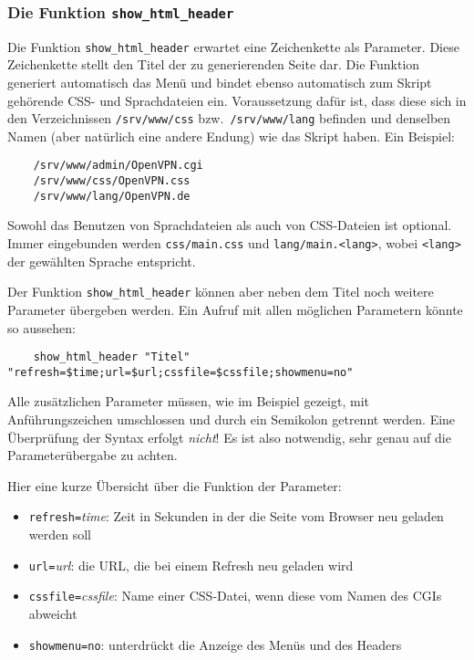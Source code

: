 \subsubsection{Die Funktion \texttt{show\_html\_header}}

Die Funktion \texttt{show\_html\_header} erwartet eine Zeichenkette als
Parameter. Diese Zeichenkette stellt den Titel der zu generierenden Seite dar.
Die Funktion generiert automatisch das Menü und bindet ebenso automatisch zum
Skript gehörende CSS- und Sprachdateien ein. Voraussetzung dafür ist, dass
diese sich in den Verzeichnissen \texttt{/srv/www/css}
bzw.\ \texttt{/srv/www/lang} befinden und denselben Namen (aber natürlich eine
andere Endung) wie das Skript haben. Ein Beispiel:

\begin{example}
\begin{verbatim}
    /srv/www/admin/OpenVPN.cgi
    /srv/www/css/OpenVPN.css
    /srv/www/lang/OpenVPN.de
\end{verbatim}
\end{example}

Sowohl das Benutzen von Sprachdateien als auch von CSS-Dateien ist optional.
Immer eingebunden werden \texttt{css/main.css} und \texttt{lang/main.<lang>},
wobei \texttt{<lang>} der gewählten Sprache entspricht.

Der Funktion \texttt{show\_html\_header} können aber neben dem Titel noch
weitere Parameter übergeben werden. Ein Aufruf mit allen möglichen Parametern
könnte so aussehen:

\begin{example}
\begin{verbatim}
    show_html_header "Titel" "refresh=$time;url=$url;cssfile=$cssfile;showmenu=no"
\end{verbatim}
\end{example}

Alle zusätzlichen Parameter müssen, wie im Beispiel gezeigt, mit
Anführungszeichen umschlossen und durch ein Semikolon getrennt werden. Eine
Überprüfung der Syntax erfolgt \emph{nicht}! Es ist also notwendig, sehr genau
auf die Parameterübergabe zu achten.

Hier eine kurze Übersicht über die Funktion der Parameter:

\begin{itemize}
 \item \texttt{refresh=}\emph{time}: Zeit in Sekunden in der die Seite vom
    Browser neu geladen werden soll
 \item \texttt{url=}\emph{url}: die URL, die bei einem Refresh neu geladen wird
 \item \texttt{cssfile=}\emph{cssfile}: Name einer CSS-Datei, wenn diese vom
    Namen des CGIs abweicht
 \item \texttt{showmenu=no}: unterdrückt die Anzeige des Menüs und des Headers
\end{itemize}

